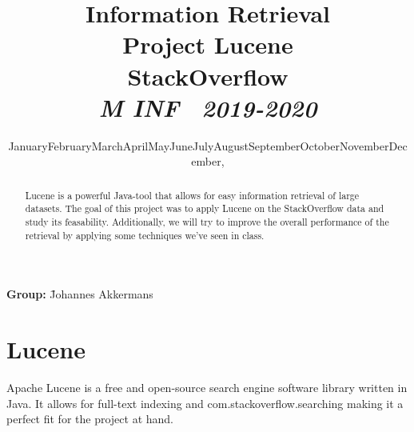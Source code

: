 \documentclass[11pt]{article}
\renewcommand{\today}{\ifcase \month \or January\or February\or March\or April\or May\or June\or July\or August\or September\or October\or November\or December\fi, \number \year}
\newcommand{\topic}{Project Lucene}
\newcommand{\paper}{StackOverflow\\
	\small{\textit{M INF \  2019-2020}}
}
\newcommand{\team}{
	\=Johannes Akkermans%
}
\begin{document}
\title{\textmd{\textbf{Information Retrieval}}\\\normalsize\vspace{0.1in}\Large{\topic}\\\large{\paper}\Large\\\vspace{0.1in}}
\author{}
\date{\today}
\maketitle
\begin{center}
	\parbox{0cm}{
		\begin{tabbing}
		\textbf{Group:} \team
		\end{tabbing}
	}
\end{center}

\vspace*{1em}

\begin{abstract}
    Lucene is a powerful Java-tool that allows for easy information retrieval of large datasets. The goal of this project was to apply Lucene on the StackOverflow data and study its feasability. Additionally, we will try to improve the overall performance of the retrieval by applying some techniques we've seen in class.
\end{abstract}

\newpage


\section{Lucene}\label{sec:lucene}
Apache Lucene is a free and open-source search engine software library written in Java. It allows for full-text indexing and com.stackoverflow.searching making it a perfect fit for the project at hand. \cite{lucene-wiki}
\end{document}
